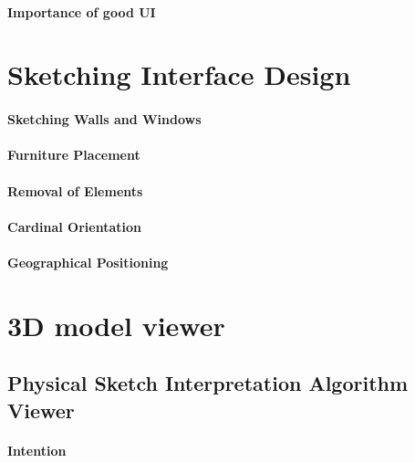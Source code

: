 		\paragraph{Importance of good UI}

	\section{Sketching Interface Design}
		\paragraph{Sketching Walls and Windows}
		\paragraph{Furniture Placement}
		\paragraph{Removal of Elements}
		\paragraph{Cardinal Orientation}
		\paragraph{Geographical Positioning}

	\section{3D model viewer}

		\subsection{Physical Sketch Interpretation Algorithm Viewer}
			\paragraph{Intention}
